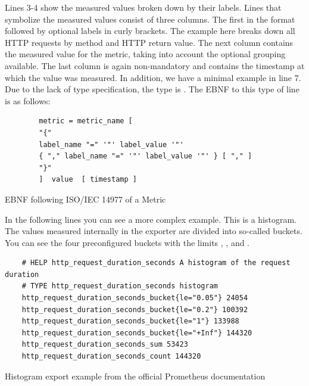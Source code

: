 Lines 3-4 show the measured values broken down by their labels. Lines that symbolize the measured values consist of three columns. The first in the format  followed by optional labels in curly brackets. The example here breaks down all HTTP requests by method and HTTP return value. The next column contains the measured value for the metric, taking into account the optional grouping available. The last column is again non-mandatory and contains the timestamp at which the value was measured. 
In addition, we have a minimal example in line 7. Due to the lack of type specification, the type is . The EBNF to this type of line is as follows:
\begin{listing}[H]
	\begin{samepage}
		\begin{verbatim}
		metric = metric_name [ 
		"{" 
		label_name "=" '"' label_value '"' 
		{ "," label_name "=" '"' label_value '"' } [ "," ] 
		"}" 
		]  value  [ timestamp ]
		\end{verbatim}
		\caption{EBNF following ISO/IEC 14977 of a Metric}
	\end{samepage}
\end{listing}

In the following lines you can see a more complex example. This is a histogram. The values measured internally in the exporter are divided into so-called buckets. You can see the four preconfigured buckets with the limits , ,  and . 
\begin{listing}[H]
	\begin{verbatim}
	# HELP http_request_duration_seconds A histogram of the request duration
	# TYPE http_request_duration_seconds histogram
	http_request_duration_seconds_bucket{le="0.05"} 24054
	http_request_duration_seconds_bucket{le="0.2"} 100392
	http_request_duration_seconds_bucket{le="1"} 133988
	http_request_duration_seconds_bucket{le="+Inf"} 144320
	http_request_duration_seconds_sum 53423
	http_request_duration_seconds_count 144320
	\end{verbatim}
	\caption{Histogram export example from the official Prometheus documentation~\cite{PrometheusExpositionFormatBeispiel}}
\end{listing}

